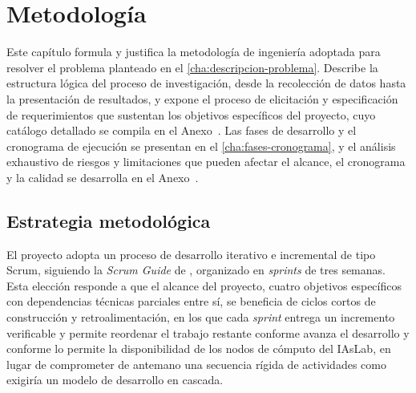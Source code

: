%
%
\chapter{Metodología}\label{cha:metodologia}

Este capítulo formula y justifica la metodología de ingeniería adoptada para resolver el problema planteado en el \cref{cha:descripcion-problema}. Describe la estructura lógica del proceso de investigación, desde la recolección de datos hasta la presentación de resultados, y expone el proceso de elicitación y especificación de requerimientos que sustentan los objetivos específicos del proyecto, cuyo catálogo detallado se compila en el Anexo~. Las fases de desarrollo y el cronograma de ejecución se presentan en el \cref{cha:fases-cronograma}, y el análisis exhaustivo de riesgos y limitaciones que pueden afectar el alcance, el cronograma y la calidad se desarrolla en el Anexo~.

\section{Estrategia metodológica}\label{sec:estrategia-metodologica}

El proyecto adopta un proceso de desarrollo iterativo e incremental de tipo Scrum, siguiendo la \emph{Scrum Guide} de \citet{schwaber-scrumguide-2020}, organizado en \emph{sprints} de tres semanas. Esta elección responde a que el alcance del proyecto, cuatro objetivos específicos con dependencias técnicas parciales entre sí, se beneficia de ciclos cortos de construcción y retroalimentación, en los que cada \emph{sprint} entrega un incremento verificable y permite reordenar el trabajo restante conforme avanza el desarrollo y conforme lo permite la disponibilidad de los nodos de cómputo del IAsLab, en lugar de comprometer de antemano una secuencia rígida de actividades como exigiría un modelo de desarrollo en cascada.

